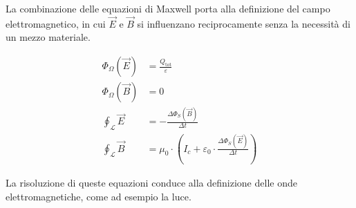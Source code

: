 La combinazione delle equazioni di Maxwell porta alla definizione del campo elettromagnetico, in cui $\vec{E}$ e $\vec{B}$ si influenzano reciprocamente senza la necessità di un mezzo materiale.

\begin{align*}
    \Phi_\Omega(\vec{E})        & = \frac{Q_{\text{tot}}}{\varepsilon}                                                           \\
    \Phi_\Omega(\vec{B})        & = 0                                                                                            \\
    \oint_{\mathcal{L}} \vec{E} & = - \frac{\Delta \Phi_S(\vec{B})}{\Delta t}                                                    \\
    \oint_{\mathcal{L}} \vec{B} & = \mu_0 \cdot \left( I_c + \varepsilon_0 \cdot \frac{\Delta \Phi_S(\vec{E})}{\Delta t} \right)
\end{align*}

La risoluzione di queste equazioni conduce alla definizione delle onde elettromagnetiche, come ad esempio la luce.
